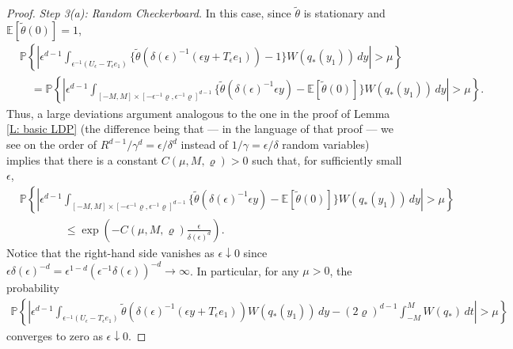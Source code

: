 \documentclass[10pt,a4paper]{amsart}
\begin{document}
\begin{proof}
	
	\textit{Step 3(a): Random Checkerboard.} In this case, since $\tilde{\theta}$ is stationary and $\mathbb{E}[\tilde{\theta}(0)] = 1$, 
		\begin{align*}
			&\mathbb{P} \left\{ \left| \epsilon^{d-1} \int_{\epsilon^{-1} (U_{\epsilon} - T_{\epsilon}e_{1})} \{\tilde{\theta}(\delta(\epsilon)^{-1} (\epsilon y + T_{\epsilon}e_{1})) - 1 \} W(q_*(y_{1})) \, dy \right| > \mu \right\} \\
			&\quad = \mathbb{P} \left\{ \left| \epsilon^{d-1} \int_{ [-M,M] \times [-\epsilon^{-1} \varrho, \epsilon^{-1} \varrho]^{d-1} } \{ \tilde{\theta}(\delta(\epsilon)^{-1}\epsilon y) - \mathbb{E} [ \tilde{\theta}(0) ] \} W(q_*(y_{1})) \, dy \right| > \mu \right\}.
		\end{align*}
	Thus, a large deviations argument analogous to the one in the proof of Lemma \ref{L: basic LDP} (the difference being that --- in the language of that proof --- we see on the order of $ R^{d-1} / \gamma^d  = \epsilon / \delta^d $ instead of $ 1 / \gamma = \epsilon / \delta $ random variables) implies that  there is a constant $C(\mu,M,\varrho) > 0$ such that, for sufficiently small $\epsilon$,
		\begin{align*}
			&\mathbb{P} \left\{ \left| \epsilon^{d-1} \int_{ [-M,M] \times [-\epsilon^{-1} \varrho, \epsilon^{-1} \varrho]^{d-1} } \{ \tilde{\theta}(\delta(\epsilon)^{-1}\epsilon y) - \mathbb{E}[\tilde{\theta}(0)] \} W(q_*(y_{1})) \, dy \right| > \mu \right\} \\
			&\qquad \qquad \leq \exp \left( - C(\mu,M,\varrho) \frac{ \epsilon }{ \delta(\epsilon)^d } \right) .
		\end{align*}
		Notice that the right-hand side vanishes as $ \epsilon \downarrow 0 $ since $ \epsilon \delta(\epsilon)^{-d} = \epsilon^{ 1 - d } ( \epsilon^{-1} \delta(\epsilon) )^{-d} \rightarrow \infty $.  In particular, for any $\mu > 0$, the probability
		\begin{align*}
			\mathbb{P} \left\{ \left| \epsilon^{d-1} \int_{\epsilon^{-1}(U_{\epsilon} - T_{\epsilon} e_1 )} \tilde{\theta}(\delta(\epsilon)^{-1} ( \epsilon y + T_{\epsilon} e_{1} ) )  W(q_*(y_{1})) \, dy - (2\varrho)^{d-1} \int_{-M}^{M} W(q_{*}) \, dt \right| > \mu \right\}
		\end{align*}
	converges to zero as $\epsilon \downarrow 0$.
	

\end{proof}
\end{document}
